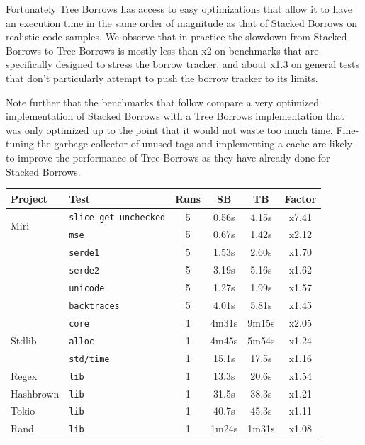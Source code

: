 \documentclass[a4paper,11pt]{article}
\theoremstyle{plain}
\theoremstyle{definition}
\theoremstyle{remark}
\begin{document}
Fortunately Tree Borrows has access to easy optimizations that allow it to have
an execution time in the same order of magnitude as that of Stacked Borrows on
realistic code samples. We observe that in practice the slowdown from Stacked Borrows
to Tree Borrows is mostly less than x2 on benchmarks that are specifically designed
to stress the borrow tracker, and about x1.3 on general tests that don't particularly attempt to
push the borrow tracker to its limits.

Note further that the benchmarks that follow compare a very optimized implementation
of Stacked Borrows with a Tree Borrows implementation that was only optimized up to
the point that it would not waste too much time. Fine-tuning the garbage collector
of unused tags and implementing a cache are likely to improve the performance of
Tree Borrows as they have already done for Stacked Borrows.



\begin{tabular}{|l|l|c|c|c|c|}
    \hline
    Project & Test & Runs & SB & TB & Factor \\
    \hline
    \multirow{2}{9em}{Miri}
        & \texttt{slice-get-unchecked} & 5 & 0.56s & 4.15s & {\color{Red}x7.41} \\
        & \texttt{mse} & 5 & 0.67s & 1.42s & {\color{Red}x2.12} \\
        & \texttt{serde1} & 5 & 1.53s & 2.60s & {\color{YellowOrange}x1.70} \\
        & \texttt{serde2} & 5 & 3.19s & 5.16s & {\color{YellowOrange}x1.62} \\
        & \texttt{unicode} & 5 & 1.27s & 1.99s & {\color{YellowOrange}x1.57} \\
        & \texttt{backtraces} & 5 & 4.01s & 5.81s & {\color{YellowOrange}x1.45} \\
    \hline
    \multirow{3}{9em}{Stdlib}
        & \texttt{core} & 1 & 4m31s & 9m15s & {\color{Red}x2.05} \\
        & \texttt{alloc} & 1 & 4m45s & 5m54s & {\color{LimeGreen}x1.24} \\
        & \texttt{std/time} & 1 & 15.1s & 17.5s & {\color{LimeGreen}x1.16} \\
    \hline
    \multirow{1}{9em}{Regex}
        & \texttt{lib} & 1 & 13.3s & 20.6s & {\color{YellowOrange}x1.54} \\
    \multirow{1}{9em}{Hashbrown}
        & \texttt{lib} & 1 & 31.5s & 38.3s & {\color{LimeGreen}x1.21} \\
    \multirow{1}{9em}{Tokio}
        & \texttt{lib} & 1 & 40.7s & 45.3s & {\color{LimeGreen}x1.11} \\
    \multirow{1}{9em}{Rand}
        & \texttt{lib} & 1 & 1m24s & 1m31s & {\color{LimeGreen}x1.08} \\
    \hline
\end{tabular}
\end{document}
